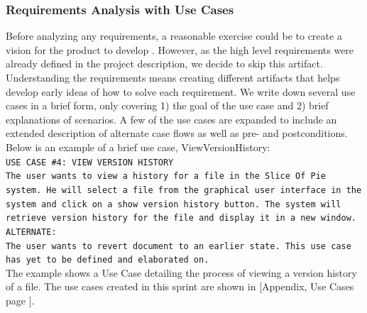 \subsubsection{Requirements Analysis with Use Cases}
Before analyzing any requirements, a reasonable exercise could be to create a vision for the product to develop \cite[p.~58]{OOAD}. However, as the high level requirements were already defined in the project description, we decide to skip this artifact.\\
\newline
Understanding the requirements means creating different artifacts that helps develop early ideas of how to solve each requirement. We write down several use cases in a brief form, only covering 1) the goal of the use case and 2) brief explanations of scenarios. A few of the use cases are expanded to include an extended description of alternate case flows as well as pre- and postconditions. Below is an example of a brief use case, ViewVersionHistory:\\
\newline
\texttt{USE CASE \#4: VIEW VERSION HISTORY\\
The user wants to view a history for a file in the Slice Of Pie system. He will select a file from the graphical user interface in the system and click on a show version history button. The system will retrieve version history for the file and display it in a new window. \\
ALTERNATE:\\
The user wants to revert document to an earlier state. This use case has yet to be defined and elaborated on.}\\
\newline
The example shows a Use Case detailing the process of viewing a version history of a file.
The use cases created in this sprint are shown in [Appendix, Use Cases page \pageref{usecases}].
